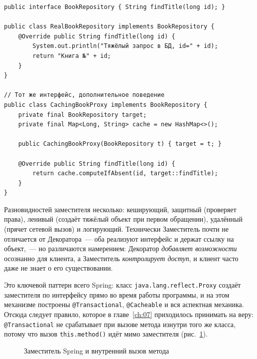 \begin{listing}[H]
\begin{verbatim}
public interface BookRepository { String findTitle(long id); }

public class RealBookRepository implements BookRepository {
    @Override public String findTitle(long id) {
        System.out.println("Тяжёлый запрос в БД, id=" + id);
        return "Книга №" + id;
    }
}

// Тот же интерфейс, дополнительное поведение
public class CachingBookProxy implements BookRepository {
    private final BookRepository target;
    private final Map<Long, String> cache = new HashMap<>();

    public CachingBookProxy(BookRepository t) { target = t; }

    @Override public String findTitle(long id) {
        return cache.computeIfAbsent(id, target::findTitle);
    }
}
\end{verbatim}
\caption{Кеширующий заместитель репозитория}
\label{lst:11-7}
\end{listing}

Разновидностей заместителя несколько: кеширующий, защитный (проверяет права),
ленивый (создаёт тяжёлый объект при первом обращении), удалённый (прячет сетевой
вызов) и логирующий. Технически Заместитель почти не отличается от
Декоратора~--- оба реализуют интерфейс и держат ссылку на объект,~--- но
различаются намерением: Декоратор \emph{добавляет возможности} осознанно для
клиента, а Заместитель \emph{контролирует доступ}, и клиент часто даже не знает
о его существовании.

Это ключевой паттерн всего Spring: класс \texttt{java.lang.reflect.Proxy} создаёт
заместителя по интерфейсу прямо во время работы программы, и на этом механизме
построены \texttt{@Transactional}, \texttt{@Cacheable} и вся аспектная механика.
Отсюда следует правило, которое в главе~\ref{ch:07} приходилось принимать на
веру: \texttt{@Transactional} не срабатывает при вызове метода изнутри того же
класса, потому что вызов \texttt{this.method()} идёт мимо заместителя
(рис.~\ref{fig:11-2}).

\begin{figure}[htbp]\centering
{}
\caption{Заместитель Spring и внутренний вызов метода}\label{fig:11-2}
\end{figure}

